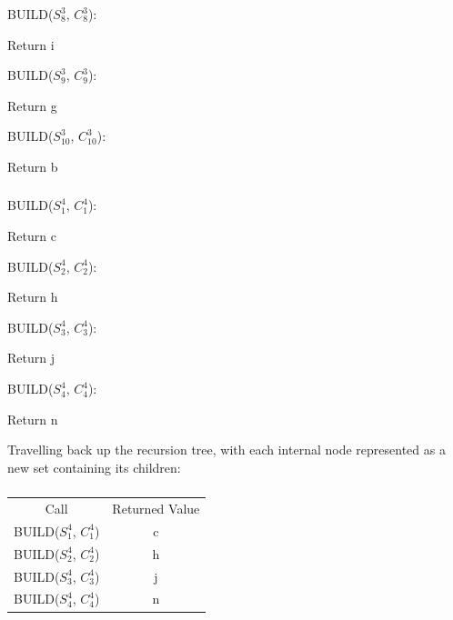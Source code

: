 \documentclass[11pt]{article} %
\begin{document}
	\hspace{0.5cm}BUILD($S_8^3$, $C_8^3$):
		\begin{center}
		Return i
		\end{center}

	\hspace{0.5cm}BUILD($S_9^3$, $C_9^3$):
		\begin{center}
		Return g
		\end{center}

	\hspace{0.5cm}BUILD($S_{10}^3$, $C_{10}^3$):
		\begin{center}
		Return b
		\end{center}


\subsubsection{}

	\hspace{0.5cm}BUILD($S_1^4$, $C_1^4$):
		\begin{center}
		Return c
		\end{center}

	\hspace{0.5cm}BUILD($S_2^4$, $C_2^4$):
		\begin{center}
		Return h
		\end{center}

	\hspace{0.5cm}BUILD($S_3^4$, $C_3^4$):
		\begin{center}
		Return j
		\end{center}

	\hspace{0.5cm}BUILD($S_4^4$, $C_4^4$):
		\begin{center}
		Return n
		\end{center}

Travelling back up the recursion tree, with each internal node represented as a new set containing its children:

\setcounter{subsubsection}{3}
\subsubsection{}
	\begin{center}
	\begin{tabular}{c c}
		Call & Returned Value \\
		BUILD($S_1^4$, $C_1^4$) & c \\
		BUILD($S_2^4$, $C_2^4$) & h \\
		BUILD($S_3^4$, $C_3^4$) & j \\
		BUILD($S_4^4$, $C_4^4$) & n
	\end{tabular}
	\end{center}
\end{document}
